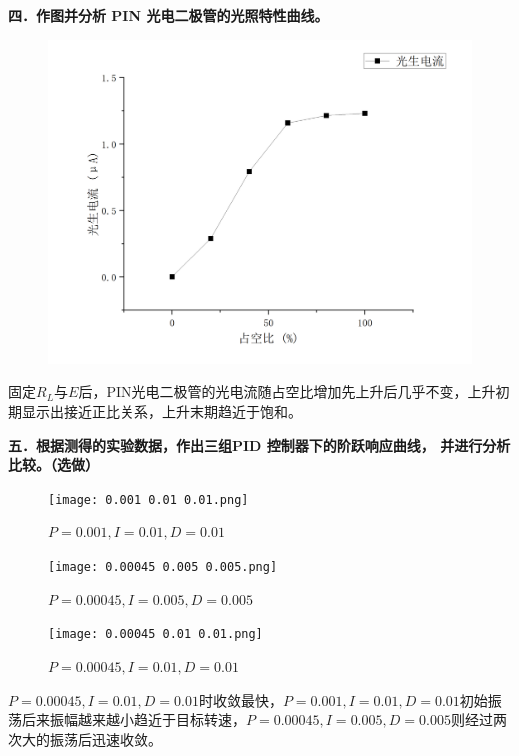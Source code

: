 \documentclass[dvipsnames, svgnames,a4paper,11pt]{article}
\begin{document}
\textbf{四．作图并分析 PIN 光电二极管的光照特性曲线。}\\
\begin{figure}[H]
	\includegraphics*[width=\textwidth]{光生电流占空比.png}
\end{figure}
固定$R_L$与$E$后，PIN光电二极管的光电流随占空比增加先上升后几乎不变，上升初期显示出接近正比关系，上升末期趋近于饱和。

\textbf{五．根据测得的实验数据，作出三组PID 控制器下的阶跃响应曲线， 并进行分析比较。（选做）}\\
\begin{figure}[H]     
	\texttt{[image: 0.001 0.01 0.01.png]}
	\caption{$P=0.001,I=0.01,D=0.01$}  	    
\end{figure}  
\begin{figure}[H]
	\texttt{[image: 0.00045 0.005 0.005.png]}
	\caption{$P=0.00045,I=0.005,D=0.005$}
\end{figure}
\begin{figure}[H]
	\texttt{[image: 0.00045 0.01 0.01.png]}
	\caption{$P=0.00045,I=0.01,D=0.01$}
\end{figure}
$P=0.00045,I=0.01,D=0.01$时收敛最快，$P=0.001,I=0.01,D=0.01$初始振荡后来振幅越来越小趋近于目标转速，$P=0.00045,I=0.005,D=0.005$则经过两次大的振荡后迅速收敛。
\end{document}
